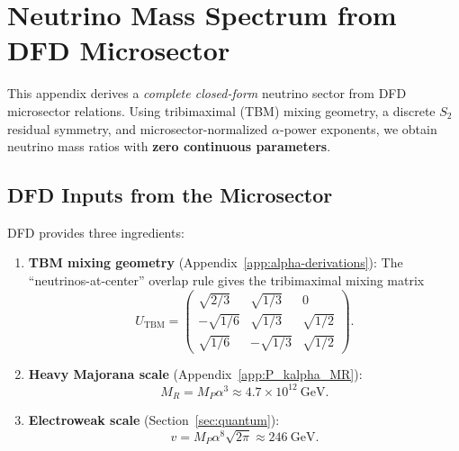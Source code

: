 
\section{Neutrino Mass Spectrum from DFD Microsector}\label{app:neutrino}

This appendix derives a \emph{complete closed-form} neutrino sector from DFD 
microsector relations. Using tribimaximal (TBM) mixing geometry, a discrete 
$S_2$ residual symmetry, and microsector-normalized $\alpha$-power exponents,
we obtain neutrino mass ratios with \textbf{zero continuous parameters}.

\subsection{DFD Inputs from the Microsector}\label{app:nu-inputs}

DFD provides three ingredients:

\begin{enumerate}
\item \textbf{TBM mixing geometry} (Appendix~\ref{app:alpha-derivations}): The 
``neutrinos-at-center'' overlap rule gives the tribimaximal mixing matrix
\begin{equation}
U_{\mathrm{TBM}} = \begin{pmatrix}
\sqrt{2/3} & \sqrt{1/3} & 0 \\
-\sqrt{1/6} & \sqrt{1/3} & \sqrt{1/2} \\
\sqrt{1/6} & -\sqrt{1/3} & \sqrt{1/2}
\end{pmatrix}.
\end{equation}

\item \textbf{Heavy Majorana scale} (Appendix~\ref{app:P_kalpha_MR}):
\begin{equation}
M_R = M_P \alpha^3 \approx 4.7 \times 10^{12}~\text{GeV}.
\end{equation}

\item \textbf{Electroweak scale} (Section~\ref{sec:quantum}):
\begin{equation}
v = M_P \alpha^8 \sqrt{2\pi} \approx 246~\text{GeV}.
\end{equation}
\end{enumerate}

